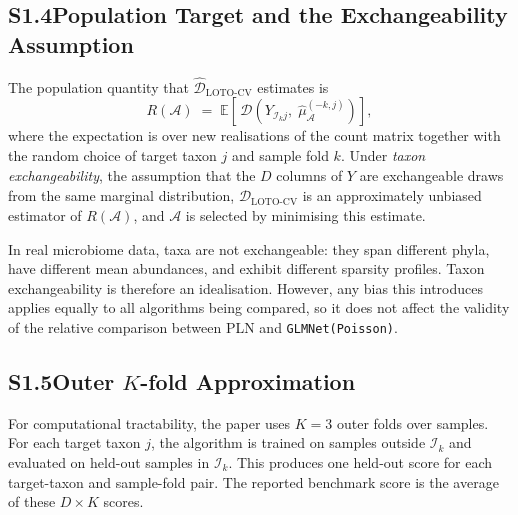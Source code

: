 \documentclass[11pt]{article}
\begin{document}
\subsection*{S1.4\quad Population Target and the Exchangeability Assumption}

The population quantity that $\widehat{\mathcal{D}}_{\mathrm{LOTO}\text{-}\mathrm{CV}}$ estimates is
\[
  R(\mathcal{A})
  \;=\;
  \mathbb{E}\!\left[\,\mathcal{D}\!\left(Y_{\mathcal{I}_k j},\; \hat{\mu}^{(-k,j)}_{\mathcal{A}}\right)\right],
\]
where the expectation is over new realisations of the count matrix together with the random choice of target taxon $j$ and sample fold $k$.
Under \emph{taxon exchangeability}, the assumption that the $D$ columns of $Y$ are exchangeable draws from the same marginal distribution, $\widehat{\mathcal{D}}_{\mathrm{LOTO}\text{-}\mathrm{CV}}$ is an approximately unbiased estimator of $R(\mathcal{A})$, and $\mathcal{A}$ is selected by minimising this estimate.

In real microbiome data, taxa are not exchangeable: they span different phyla, have different mean abundances, and exhibit different sparsity profiles.
Taxon exchangeability is therefore an idealisation.
However, any bias this introduces applies equally to all algorithms being compared, so it does not affect the validity of the relative comparison between PLN and \texttt{GLMNet(Poisson)}.

\subsection*{S1.5\quad Outer $K$-fold Approximation}

For computational tractability, the paper uses $K = 3$ outer folds over samples.
For each target taxon $j$, the algorithm is trained on samples outside $\mathcal{I}_k$ and evaluated on held-out samples in $\mathcal{I}_k$.
This produces one held-out score for each target-taxon and sample-fold pair.
The reported benchmark score is the average of these $D \times K$ scores.

\clearpage
\end{document}

